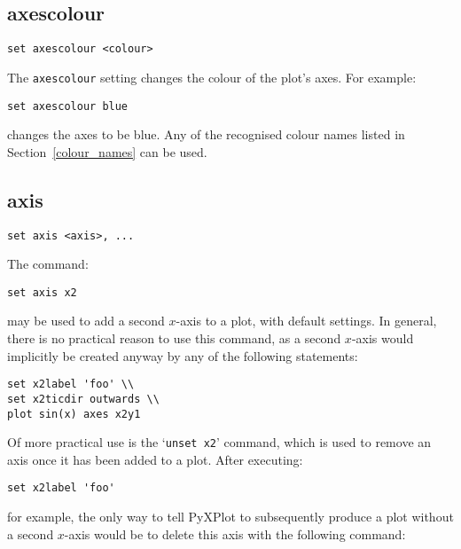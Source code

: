 \subsection{axescolour}

\begin{verbatim}
set axescolour <colour>
\end{verbatim}

The {\tt axescolour} setting changes the colour of the plot's axes.  For example:

\begin{verbatim}
set axescolour blue
\end{verbatim}

\noindent changes the axes to be blue. Any of the recognised colour names listed in
Section~\ref{colour_names} can be used.
 

\subsection{axis}

\begin{verbatim}
set axis <axis>, ...
\end{verbatim}

The command:

\begin{verbatim}
set axis x2
\end{verbatim}

\noindent may be used to add a second $x$-axis to a plot, with default settings. In
general, there is no practical reason to use this command, as a second $x$-axis
would implicitly be created anyway by any of the following statements:

\begin{verbatim}
set x2label 'foo' \\
set x2ticdir outwards \\
plot sin(x) axes x2y1
\end{verbatim}

Of more practical use is the `{\tt unset x2}' command, which is used to remove an
axis once it has been added to a plot. After executing:

\begin{verbatim}
set x2label 'foo'
\end{verbatim}

\noindent for example, the only way to tell PyXPlot to subsequently produce a plot
without a second $x$-axis would be to delete this axis with the following
command:


